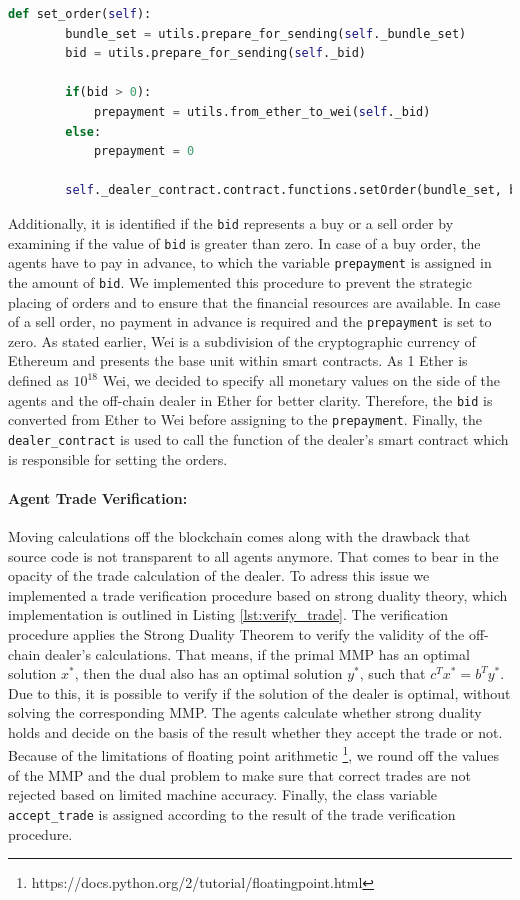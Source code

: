 \begin{lstlisting}[float=htbp, label=lst:set_order, caption=Submitting of Order to Smart Contract Dealer, language=Python]
    def set_order(self):
        bundle_set = utils.prepare_for_sending(self._bundle_set)
        bid = utils.prepare_for_sending(self._bid)
        
        if(bid > 0):
            prepayment = utils.from_ether_to_wei(self._bid)
        else:
            prepayment = 0

        self._dealer_contract.contract.functions.setOrder(bundle_set, bid, prepayment).transact({'from': self._account_address, 'value': prepayment})
\end{lstlisting}

Additionally, it is identified if the \verb|bid| represents a buy or a sell order by examining if the value 
of \verb|bid| is greater than zero. In case of a buy order, the agents have to pay in advance, to which 
the variable \verb|prepayment| is assigned in the amount of \verb|bid|.
We implemented this procedure to prevent the strategic placing of orders and to ensure 
that the financial resources are available.
In case of a sell order, no payment in advance is required and the \verb|prepayment| is set to zero.
As stated earlier, Wei is a subdivision of the cryptographic currency of Ethereum and presents the base unit within smart contracts.
As 1 Ether is defined as $10^{18}$ Wei, we decided to specify all monetary values on the side 
of the agents and the off-chain dealer in Ether for better clarity.
Therefore, the \verb|bid| is converted from Ether to Wei before assigning to the \verb|prepayment|.
Finally, the \verb|dealer_contract| is used to call the function of the dealer's smart contract which is
responsible for setting the orders.

\paragraph{Agent Trade Verification:} Moving calculations off the blockchain comes along with the drawback that source code is not
transparent to all agents anymore. 
That comes to bear in the opacity of the trade calculation of the dealer. 
To adress this issue we implemented a trade verification procedure based on 
strong duality theory, which implementation is outlined in Listing \ref{lst:verify_trade}.
The verification procedure applies the Strong Duality Theorem to verify the validity of the off-chain dealer's calculations.
That means, if the primal MMP has an optimal solution $x^{*}$, then 
the dual also has an optimal solution $y^{*}$, such that $c^{T}x^{*} = b^{T}y^{*}$.
Due to this, it is possible to verify if the solution of the dealer is optimal, without solving the corresponding MMP. 
The agents calculate whether strong duality holds and decide on the basis of the result whether they accept the trade or not.
Because of the limitations of floating point arithmetic \footnote{https://docs.python.org/2/tutorial/floatingpoint.html}, 
we round off the values of the MMP and the dual problem to make sure that correct trades 
are not rejected based on limited machine accuracy.
Finally, the class variable \verb|accept_trade| is assigned according to the result of the trade verification 
procedure.

